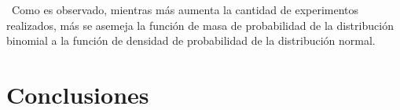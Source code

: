 \documentclass[8pt]{article}
\begin{document}
\
Como es observado, mientras más aumenta la cantidad de experimentos realizados, más se asemeja la función de masa de probabilidad de la distribución binomial a la función de densidad de probabilidad de la distribución normal.



\section{Conclusiones}
\end{document}

